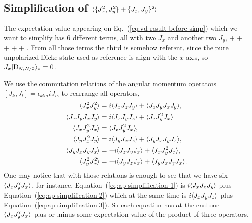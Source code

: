 \subsection[Simplification of the Eq.~{(\ref{eq:vd-result-before-simp})}]
{Simplification of $\langle \{J_x^2,J_y^2\}+\{J_x,J_y\}^2 \rangle$}
\label{app:simplification-of-4th-moments}

The expectation value appearing on Eq.~{(\ref{eq:vd-result-before-simp})} which we want to simplify has 6 different terms, all with two $J_x$ and another two $J_y$,
\be
   +  + 
  +  +  + .
\ee
From all those terms the third is somehow referent, since the pure unpolarized Dicke state used as reference is align with the $x$-axis, so $J_x\vert \textnormal{D}_{N,N/2} \rangle_x=0$.

We use the commutation relations of the angular momentum operators $[J_k,J_l]=\epsilon_{klm} iJ_m$ to rearrange all operators,
\begin{subequations}
\begin{align}
  \langle J_x^2J_y^2 \rangle & = i\langle J_xJ_zJ_y \rangle+\langle J_xJ_yJ_xJ_y \rangle,
  \label{eq:ap-simplification-1} \\
  \langle J_xJ_yJ_xJ_y \rangle & = i\langle J_xJ_yJ_z \rangle+\langle J_xJ_y^2J_x \rangle,
  \label{eq:ap-simplification-2} \\
  \langle J_xJ_y^2J_x \rangle & = \langle J_xJ_y^2J_x \rangle,
  \label{eq:ap-simplification-3} \\
  \langle J_yJ_x^2J_y \rangle & = i\langle J_yJ_xJ_z \rangle + \langle J_yJ_xJ_yJ_x \rangle,
  \label{eq:ap-simplification-4} \\
  \langle J_yJ_xJ_yJ_x \rangle & = -i\langle J_zJ_yJ_x \rangle + \langle J_xJ_y^2J_x \rangle,
  \label{eq:ap-simplification-5} \\
  \langle J_y^2J_x^2 \rangle & = -i\langle J_yJ_zJ_x \rangle + \langle J_yJ_xJ_yJ_x \rangle.
  \label{eq:ap-simplification-6}
\end{align}
\end{subequations}
One may notice that with those relations is enough to see that we have six $\langle J_xJ_y^2J_x \rangle$, for instance, Equation~{(\ref{eq:ap-simplification-1})} is $i\langle J_xJ_zJ_y \rangle$ plus Equation~{(\ref{eq:ap-simplification-2})} which at the same time is $i\langle J_xJ_yJ_z \rangle$ plus Equation~{(\ref{eq:ap-simplification-3})}.
So each equation has at the end one $\langle J_xJ_y^2J_x \rangle$ plus or minus some expectation value of the product of three operators.

